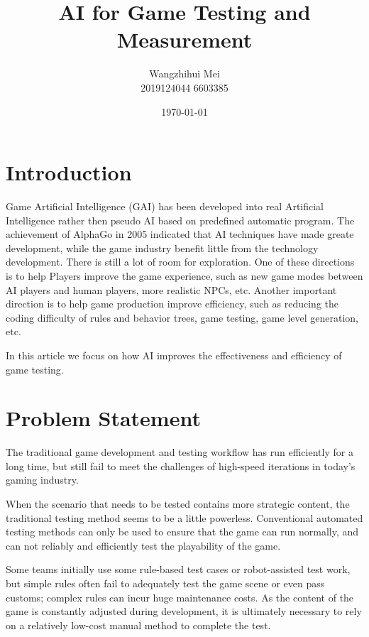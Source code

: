 \documentclass[11pt,en,authoryear]{elegantpaper}
\title{ AI for Game Testing and Measurement}
\author{Wangzhihui Mei \\ 2019124044 6603385}
\institute{UOW-CCNU JI}
\date{\today}
\begin{document}
\maketitle

 


\section{Introduction}
\noindent
Game Artificial Intelligence (GAI) has been developed into real Artificial Intelligence rather then pseudo AI based on predefined automatic program. The achievement of AlphaGo in 2005 indicated that AI techniques have made greate development, while the game industry benefit little from the technology development. There is still a lot of room for exploration. One of these directions is to help Players improve the game experience, such as new game modes between AI players and human players, more realistic NPCs, etc. Another important direction is to help game production improve efficiency, such as reducing the coding difficulty of rules and behavior trees, game testing, game level generation, etc.

\noindent
In this article we focus on how AI improves the effectiveness and efficiency of game testing.

\section{Problem Statement}
The traditional game development and testing workflow has run efficiently for a long time, but still fail to meet the challenges of high-speed iterations in today's gaming industry.

When the scenario that needs to be tested contains more strategic content, the traditional testing method seems to be a little powerless. Conventional automated testing methods can only be used to ensure that the game can run normally, and can not reliably and efficiently test the playability of the game.

Some teams initially use some rule-based test cases or robot-assisted test work, but simple rules often fail to adequately test the game scene or even pass customs; complex rules can incur huge maintenance costs. As the content of the game is constantly adjusted during development, it is ultimately necessary to rely on a relatively low-cost manual method to complete the test.
\end{document}
